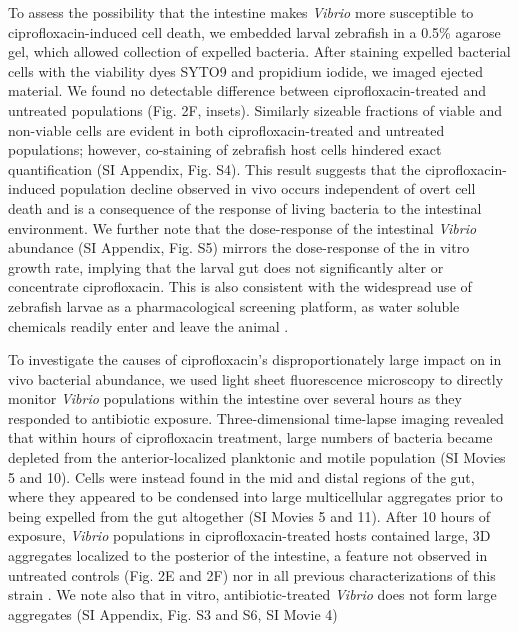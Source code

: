 To assess the possibility that the intestine makes \textit{Vibrio} more susceptible to ciprofloxacin-induced cell death, we embedded larval zebrafish in a 0.5\% agarose gel, which allowed collection of expelled bacteria. After staining expelled bacterial cells with the viability dyes SYTO9 and propidium iodide, we imaged ejected material. We found  no detectable difference between ciprofloxacin-treated and untreated populations (Fig. 2F, insets). Similarly sizeable fractions of viable and non-viable cells are evident in both ciprofloxacin-treated and untreated populations; however, co-staining of zebrafish host cells hindered exact quantification (SI Appendix, Fig. S4). This result suggests that the ciprofloxacin-induced population decline observed in vivo occurs independent of overt cell death and is a consequence of the response of living bacteria to the intestinal environment. We further note that the dose-response of the intestinal \textit{Vibrio} abundance (SI Appendix, Fig. S5) mirrors the dose-response of the in vitro growth rate, implying that the larval gut does not significantly alter or concentrate ciprofloxacin. This is also consistent with the widespread use of zebrafish larvae as a  pharmacological screening platform, as water soluble chemicals readily enter and leave the animal \cite{rennekamp201515,yoganantharjah2017use}.

To investigate the causes of ciprofloxacin's disproportionately large impact on in vivo bacterial abundance, we used light sheet fluorescence microscopy to directly monitor \textit{Vibrio} populations within the intestine over several hours as they responded to antibiotic exposure. Three-dimensional time-lapse imaging revealed that within hours of ciprofloxacin treatment, large numbers of bacteria became depleted from the anterior-localized planktonic and motile population (SI Movies 5 and 10). Cells were instead found in the mid and distal regions of the gut, where they appeared to be condensed into large multicellular aggregates prior to being expelled from the gut altogether (SI Movies 5 and 11). After 10 hours of exposure, \textit{Vibrio} populations in ciprofloxacin-treated hosts contained large, 3D aggregates localized to the posterior of the intestine, a feature not observed in untreated controls (Fig. 2E and 2F) nor in all previous characterizations of this strain \cite{wiles_host_2016,schlomann_bacterial_2018}. We note also that in vitro, antibiotic-treated \textit{Vibrio} does not form large aggregates (SI Appendix, Fig. S3 and S6, SI Movie 4)

